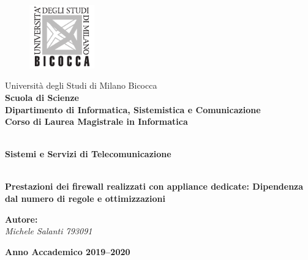 \begin{titlepage}
\begin{onehalfspace}
	\begin{figure}
		\vspace*{-7mm}
		\centering
		\includegraphics[width=0.25\textwidth]{img/logo_unimib.pdf}
	\end{figure}
	\par
	\noindent Università degli Studi di Milano Bicocca \\
	\textbf{Scuola di Scienze \\
			Dipartimento di Informatica, Sistemistica e Comunicazione \\
			Corso di Laurea Magistrale in Informatica}
\end{onehalfspace}

\vfill
\par

\begin{doublespace}
\begin{center}
	{\Huge \textbf{\\Sistemi e Servizi di Telecomunicazione}}
\end{center}
\begin{center}
	{\Large \textbf{\\Prestazioni dei firewall realizzati con appliance dedicate: Dipendenza dal numero di regole e ottimizzazioni}}
\end{center}
\end{doublespace}

\vfill
\par

\begin{onehalfspace}

\vspace{8mm}
\par

\begin{flushright}
	{\large \textbf{Autore:} \\
			\textit{Michele Salanti 793091}
	}
\end{flushright}
\end{onehalfspace}

\vfill
\par

\begin{center}
	{\large \textbf{Anno Accademico 2019--2020}}
\end{center}

\end{titlepage}
